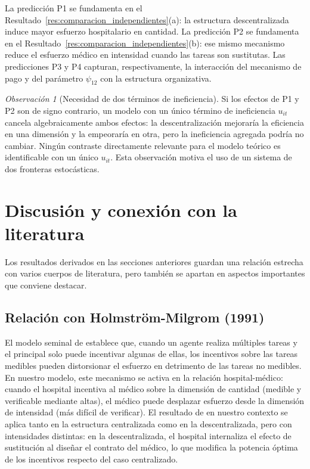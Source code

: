 \documentclass[12pt, a4paper, twoside, openright]{book}
\theoremstyle{plain}
\theoremstyle{definition}
\theoremstyle{remark}
\newtheorem{remark}{Observación}[chapter]
\begin{document}
La predicción P1 se fundamenta en el Resultado~\ref{res:comparacion_independientes}(a): la estructura descentralizada induce mayor esfuerzo hospitalario en cantidad. La predicción P2 se fundamenta en el Resultado~\ref{res:comparacion_independientes}(b): ese mismo mecanismo reduce el esfuerzo médico en intensidad cuando las tareas son sustitutas. Las predicciones P3 y P4 capturan, respectivamente, la interacción del mecanismo de pago y del parámetro $\psi_{12}$ con la estructura organizativa.

\begin{remark}[Necesidad de dos términos de ineficiencia]
Si los efectos de P1 y P2 son de signo contrario, un modelo con un único término de ineficiencia $u_{it}$ cancela algebraicamente ambos efectos: la descentralización mejoraría la eficiencia en una dimensión y la empeoraría en otra, pero la ineficiencia agregada podría no cambiar. Ningún contraste directamente relevante para el modelo teórico es identificable con un único $u_{it}$. Esta observación motiva el uso de un sistema de dos fronteras estocásticas.
\end{remark}


\section{Discusión y conexión con la literatura}
\label{sec:discusion_literatura}

Los resultados derivados en las secciones anteriores guardan una relación estrecha con varios cuerpos de literatura, pero también se apartan en aspectos importantes que conviene destacar.

\subsection{Relación con Holmström-Milgrom (1991)}

El modelo seminal de \citet{holmstrom1991} establece que, cuando un agente realiza múltiples tareas y el principal solo puede incentivar algunas de ellas, los incentivos sobre las tareas medibles pueden distorsionar el esfuerzo en detrimento de las tareas no medibles. En nuestro modelo, este mecanismo se activa en la relación hospital-médico: cuando el hospital incentiva al médico sobre la dimensión de cantidad (medible y verificable mediante altas), el médico puede desplazar esfuerzo desde la dimensión de intensidad (más difícil de verificar). El resultado de \citet{holmstrom1991} en nuestro contexto se aplica tanto en la estructura centralizada como en la descentralizada, pero con intensidades distintas: en la descentralizada, el hospital internaliza el efecto de sustitución al diseñar el contrato del médico, lo que modifica la potencia óptima de los incentivos respecto del caso centralizado.
\end{document}
